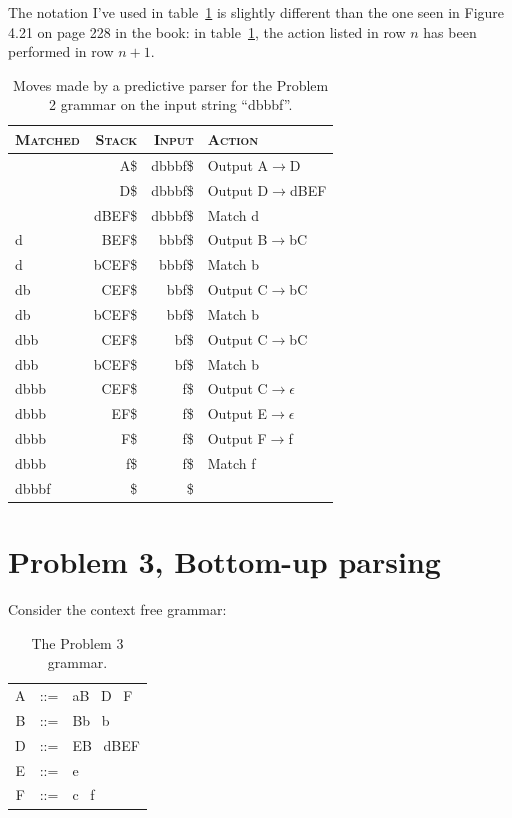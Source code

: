 The notation I've used in table~\ref{tab:2c} is slightly different than the one seen in Figure 4.21 on page 228 in the book:
in table~\ref{tab:2c}, the action listed in row $n$ has been performed in row $n+1$.


\begin{table}[H]
\begin{center}
\begin{tabular}{lrrl}
	\hline \hline
	\textsc{Matched} & \textsc{Stack} 	& \textsc{Input}	& \textsc{Action}	\\ \hline
					 & A\$				& dbbbf\$			& Output A$\rightarrow$D		\\
					 & D\$				& dbbbf\$			& Output D$\rightarrow$dBEF	\\
					 & dBEF\$			& dbbbf\$			& Match d		  	\\ 
	d				 & BEF\$			& bbbf\$			& Output B$\rightarrow$bC		\\
	d				 & bCEF\$			& bbbf\$			& Match b			\\
	db				 & CEF\$			& bbf\$				& Output C$\rightarrow$bC		\\
	db				 & bCEF\$			& bbf\$				& Match b			\\
	dbb				 & CEF\$			& bf\$				& Output C$\rightarrow$bC		\\
	dbb				 & bCEF\$			& bf\$				& Match b			\\
	dbbb			 & CEF\$			& f\$				& Output C$\rightarrow\epsilon$		\\
	dbbb			 & EF\$				& f\$				& Output E$\rightarrow\epsilon$		\\
	dbbb			 & F\$				& f\$				& Output F$\rightarrow$f		\\
	dbbb			 & f\$				& f\$				& Match f			\\
	dbbbf			 & \$				& \$				& 					\\ \hline					
\end{tabular}
\caption{Moves made by a predictive parser for the Problem 2 grammar on the input string ``dbbbf''.}
\label{tab:2c}
\end{center}
\end{table}

\section{Problem 3, Bottom-up parsing}
Consider the context free grammar:

\begin{table}[H]
\begin{tabular}{ccl}
	A	& ::=	& aB \textbar ~D \textbar ~F \\
	B 	& ::=	& Bb \textbar ~b \\
	D  	& ::=	& EB \textbar ~dBEF \\
	E 	& ::=	& e \\
	F 	& ::=	& c \textbar ~f \\
\end{tabular}
\caption{The Problem 3 grammar.}
\label{tab:3}
\end{table}


